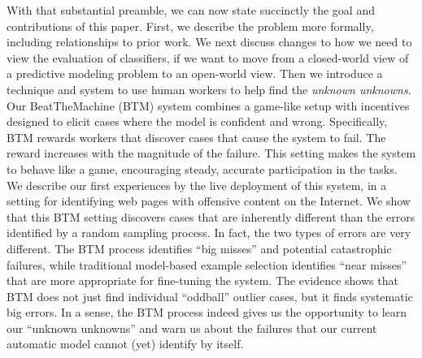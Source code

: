 With that substantial preamble, we can now state succinctly the goal
and contributions of this paper.  First, we describe the problem more
formally, including relationships to prior work.  We next discuss
changes to how we need to view the evaluation of classifiers, if we
want to move from a closed-world view of a predictive modeling problem
to an open-world view.  Then we introduce a technique and system to use
human workers to help find the \emph{unknown unknowns}.  Our
BeatTheMachine (BTM) system combines a game-like setup with incentives
designed to elicit cases where the model is confident and wrong.
Specifically, BTM rewards workers that discover cases that cause the
system to fail. The reward increases with the magnitude of the
failure. This setting makes the system to behave like a game,
encouraging steady, accurate participation in the tasks. We describe
our first experiences by the live deployment of this system, in a
setting for identifying web pages with offensive content on the
Internet. We show that this BTM setting discovers cases that are
inherently different than the errors identified by a random sampling
process. In fact, the two types of errors are very different. The BTM
process identifies ``big misses'' and potential catastrophic failures,
while traditional model-based example selection identifies ``near
misses'' that are more appropriate for fine-tuning the system.  The
evidence shows that BTM does not just find individual ``oddball''
outlier cases, but it finds systematic big errors.  In a sense, the
BTM process indeed gives us the opportunity to learn our ``unknown
unknowns'' and warn us about the failures that our current automatic
model cannot (yet) identify by itself.


